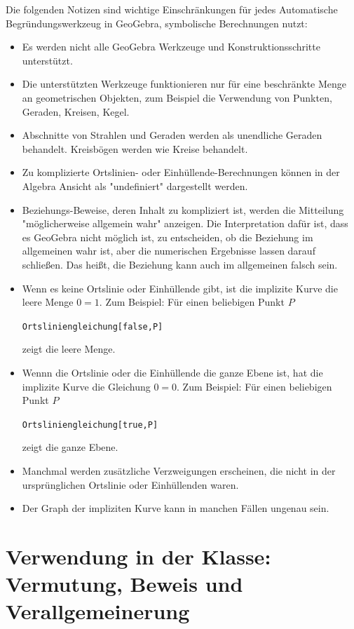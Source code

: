 \documentclass{article}
\begin{document}
Die folgenden Notizen sind wichtige Einschränkungen für jedes Automatische Begründungswerkzeug in GeoGebra, symbolische Berechnungen nutzt:
\begin{itemize}
\item Es werden nicht alle GeoGebra Werkzeuge und Konstruktionsschritte unterstützt.
\item Die unterstützten Werkzeuge funktionieren nur für eine beschränkte Menge an geometrischen Objekten, zum Beispiel die Verwendung von Punkten, Geraden, Kreisen, Kegel.
\item Abschnitte von Strahlen und Geraden werden als unendliche Geraden behandelt. Kreisbögen werden wie Kreise behandelt.
\item Zu komplizierte Ortslinien- oder Einhüllende-Berechnungen können in der Algebra Ansicht als "undefiniert" dargestellt werden.
\item Beziehungs-Beweise, deren Inhalt zu kompliziert ist, werden die Mitteilung "möglicherweise allgemein wahr" anzeigen. Die Interpretation dafür ist, dass es GeoGebra nicht möglich ist, zu entscheiden, ob die Beziehung im allgemeinen wahr ist, aber die numerischen Ergebnisse lassen darauf schließen.
Das heißt, die Beziehung kann auch im allgemeinen falsch sein.
\item Wenn es keine Ortslinie oder Einhüllende gibt, ist die implizite Kurve die leere Menge $0=1$. Zum Beispiel: Für einen beliebigen Punkt $P$
\begin{center}
\texttt{Ortsliniengleichung[false,P]}
\end{center}
zeigt die leere Menge.
\item Wennn die Ortslinie oder die Einhüllende die ganze Ebene ist, hat die implizite Kurve die Gleichung $0=0$. Zum Beispiel: Für einen beliebigen Punkt $P$
\begin{center}
\texttt{Ortsliniengleichung[true,P]}
\end{center}
zeigt die ganze Ebene.
\item Manchmal werden zusätzliche Verzweigungen erscheinen, die nicht in der ursprünglichen Ortslinie oder Einhüllenden waren.
\item Der Graph der impliziten Kurve kann in manchen Fällen ungenau sein.
\end{itemize}

\section{Verwendung in der Klasse: Vermutung, Beweis und Verallgemeinerung}
\end{document}
